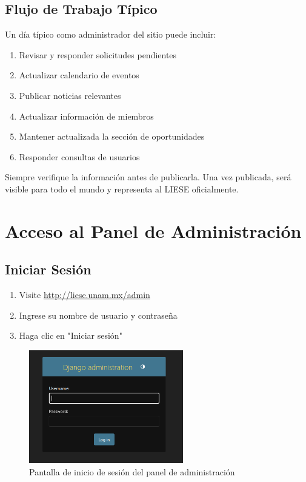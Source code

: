 \documentclass[12pt,letterpaper]{report}
\newenvironment{warning-box}
    {\begin{mdframed}[linecolor=warning,linewidth=2pt,backgroundcolor=warning!10]
    \textbf{Advertencia:}\par}
    {\end{mdframed}}
\begin{document}
\section{Flujo de Trabajo Típico}
Un día típico como administrador del sitio puede incluir:

\begin{enumerate}
    \item Revisar y responder solicitudes pendientes
    \item Actualizar calendario de eventos
    \item Publicar noticias relevantes
    \item Actualizar información de miembros
    \item Mantener actualizada la sección de oportunidades
    \item Responder consultas de usuarios
\end{enumerate}

\begin{warning-box}
Siempre verifique la información antes de publicarla. Una vez publicada, será visible para todo el mundo y representa al LIESE oficialmente.
\end{warning-box}

\chapter{Acceso al Panel de Administración}

\section{Iniciar Sesión}
\begin{enumerate}
    \item Visite \url{http://liese.unam.mx/admin}
    \item Ingrese su nombre de usuario y contraseña
    \item Haga clic en "Iniciar sesión"
\end{enumerate}

\begin{figure}[H]
    \centering
    \includegraphics[width=0.6\textwidth]{images/login.png}
    \caption{Pantalla de inicio de sesión del panel de administración}
\end{figure}
\end{document}
